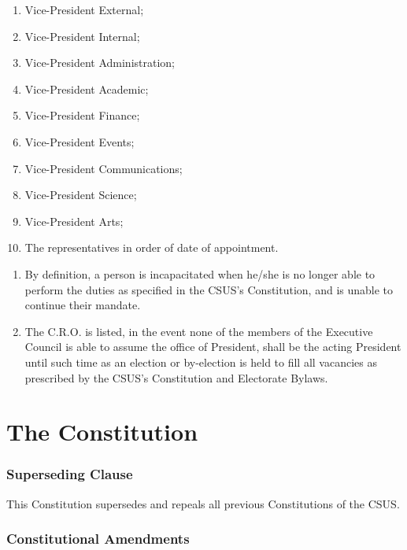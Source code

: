 \begin{enumerate}
\def\labelenumi{(\alph{enumi})}
\item
  Vice-President External;
\item
  Vice-President Internal;
\item
  Vice-President Administration;
\item
  Vice-President Academic;
\item
  Vice-President Finance;
\item
  Vice-President Events;
\item
  Vice-President Communications;
\item
  Vice-President Science;
\item
  Vice-President Arts;
\item
  The representatives in order of date of appointment.
\end{enumerate}

\begin{enumerate}
\def\labelenumi{\arabic{enumi}.}
\setcounter{enumi}{2}
\tightlist
\item
  By definition, a person is incapacitated when he/she is no longer able
  to perform the duties as specified in the CSUS's Constitution, and is
  unable to continue their mandate.
\item
  The C.R.O. is listed, in the event none of the members of the Executive
  Council is able to assume the office of President, shall be the acting
  President until such time as an election or by-election is held to fill
  all vacancies as prescribed by the CSUS's Constitution and Electorate
  Bylaws.
\end{enumerate}

\part{The Constitution}\label{the-constitution}

\section{Superseding Clause}\label{superseding-clause}

This Constitution supersedes and repeals all previous Constitutions of
the CSUS.

\section{Constitutional
Amendments}\label{constitutional-amendments}

